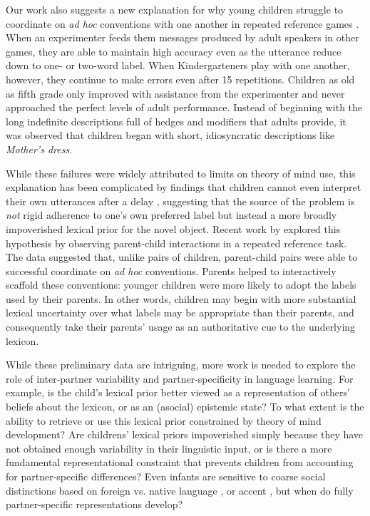 Our work also suggests a new explanation for why young children struggle to coordinate on \emph{ad hoc} conventions with one another in repeated reference games \cite{GlucksbergKraussWeisberg66_DevoRefGames,KraussGlucksberg69_DevoReferenceGames,KraussGlucksberg77_SocialNonsocialSpeech}. 
When an experimenter feeds them messages produced by adult speakers in other games, they are able to maintain high accuracy even as the utterance reduce down to one- or two-word label. 
When Kindergarteners play with one another, however, they continue to make errors even after 15 repetitions.
Children as old as fifth grade only improved with assistance from the experimenter and never approached the perfect levels of adult performance. 
Instead of beginning with the long indefinite descriptions full of hedges and modifiers that adults provide, it was observed that children began with short, idiosyncratic descriptions like \emph{Mother's dress}. 

While these failures were widely attributed to limits on theory of mind use, this explanation has been complicated by findings that children cannot even interpret their own utterances after a delay \cite{asher1976children}, suggesting that the source of the problem is \emph{not} rigid adherence to one's own preferred label but instead a more broadly impoverished lexical prior for the novel object.
Recent work by  explored this hypothesis by observing parent-child interactions in a repeated reference task. 
The data suggested that, unlike pairs of children, parent-child pairs were able to successful coordinate on \emph{ad hoc} conventions.
Parents helped to interactively scaffold these conventions: younger children were more likely to adopt the labels used by their parents.
In other words, children may begin with more substantial lexical uncertainty over what labels may be appropriate than their parents, and consequently take their parents' usage as an authoritative cue to the underlying lexicon. 

While these preliminary data are intriguing, more work is needed to explore the role of inter-partner variability and partner-specificity in language learning. 
For example, is the child's lexical prior better viewed as a representation of others' beliefs about the lexicon, or as an (asocial) epistemic state? 
To what extent is the ability to retrieve or use this lexical prior constrained by theory of mind development? 
Are childrens' lexical priors impoverished simply because they have not obtained enough variability in their linguistic input, or is there a more fundamental representational constraint that prevents children from accounting for partner-specific differences? 
Even infants are sensitive to coarse social distinctions based on foreign vs. native language \cite{KinzlerDupouxSpelke07_LanguageGroups}, or accent \cite{KinzlerEtAl09_AccentRace}, but when do fully partner-specific representations develop?

